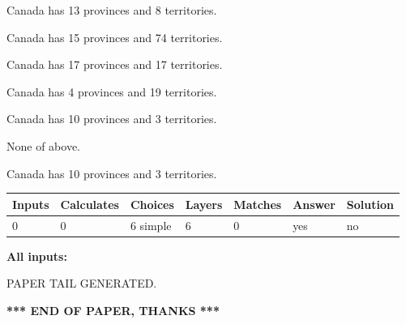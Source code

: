 \documentclass[12pt]{article}
\begin{document}
 
Canada has  13 provinces and  8 territories.
 
 
Canada has  15 provinces and  74 territories.
 
 
Canada has  17 provinces and  17 territories.
 
 
Canada has   4 provinces and  19 territories.
 
 
Canada has 10  provinces and 3 territories.
 
 
 None of above.
 
 
\noindent{}
 
 
Canada has 10  provinces and 3 territories.
 
 
\noindent{}
 
 
   
   
   
   
\noindent\begin{tabular}{|l|l|l|l|l|l|l|}
 \hline
Inputs & Calculates & Choices & Layers & Matches & Answer & Solution \\ \hline
 0  & 
 0  & 
 6
  simple  
  & 
 6  & 
 0  & 
  yes & 
  no 
  \\ \hline
 \end{tabular}
   
   
   
   
\noindent{}
   
   
   
   
\noindent\vspace{0.1in}\hspace{-0.08in} {\textbf{\Large{All inputs: }}}
   
   
   
   
   
   
 \vspace{0.2in}
 
   
   
\vspace{2.0in} PAPER TAIL GENERATED.
   
   
   
   
\vspace{1.0in} 
{\textbf{\large{ *** END OF PAPER, THANKS *** }}} 
   
\end{document}
